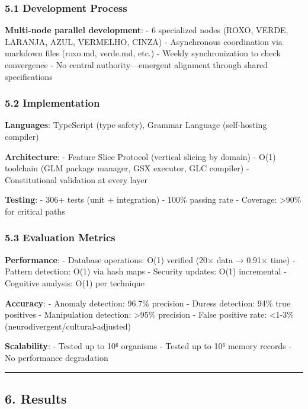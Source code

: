 \documentclass[
]{article}
\begin{document}
\subsubsection{5.1 Development Process}\label{development-process}

\textbf{Multi-node parallel development}: - 6 specialized nodes (ROXO,
VERDE, LARANJA, AZUL, VERMELHO, CINZA) - Asynchronous coordination via
markdown files (roxo.md, verde.md, etc.) - Weekly synchronization to
check convergence - No central authority---emergent alignment through
shared specifications

\subsubsection{5.2 Implementation}\label{implementation}

\textbf{Languages}: TypeScript (type safety), Grammar Language
(self-hosting compiler)

\textbf{Architecture}: - Feature Slice Protocol (vertical slicing by
domain) - O(1) toolchain (GLM package manager, GSX executor, GLC
compiler) - Constitutional validation at every layer

\textbf{Testing}: - 306+ tests (unit + integration) - 100\% passing rate
- Coverage: \textgreater90\% for critical paths

\subsubsection{5.3 Evaluation Metrics}\label{evaluation-metrics}

\textbf{Performance}: - Database operations: O(1) verified (20× data →
0.91× time) - Pattern detection: O(1) via hash maps - Security updates:
O(1) incremental - Cognitive analysis: O(1) per technique

\textbf{Accuracy}: - Anomaly detection: 96.7\% precision - Duress
detection: 94\% true positives - Manipulation detection:
\textgreater95\% precision - False positive rate: \textless1-3\%
(neurodivergent/cultural-adjusted)

\textbf{Scalability}: - Tested up to 10⁶ organisms - Tested up to 10⁶
memory records - No performance degradation

\begin{center}\rule{0.5\linewidth}{0.5pt}\end{center}

\subsection{6. Results}\label{results}
\end{document}
